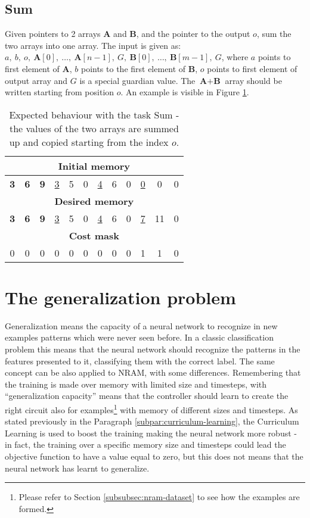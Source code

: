 \subsection{Sum}
Given pointers to 2 arrays \textbf{A} and \textbf{B}, and the pointer to the output $o$, sum the two arrays into one array. The input is given as: $a,\ b,\ o,\ \textbf{A}[0],\ \dots,\ \textbf{A}[n-1],\ G,\ \textbf{B}[0],\ \dots,\ \textbf{B}[m-1],\ G$, where $a$ points to first element of \textbf{A}, $b$ points to the first element of \textbf{B}, $o$ points to first element of output array and $G$ is a special guardian value. The $\textbf{A}+\textbf{B}$ array should be written starting from position $o$. An example is visible in Figure \ref{fig:sum-example}.
\begin{table}[h!]
	\centering
	\begin{tabular}{|c|c|c|c|c|c|c|c|c|c|c|c|}
		\hline
		\multicolumn{12}{|c|}{\textbf{Initial memory}} \\ \hline
		\textbf{3} & \textbf{6} & \textbf{9} & \underline{3} & 5 & 0 & \underline{4} & 6 & 0 & \underline{0} & 0 & 0 \\ \hline\hline\hline
		\multicolumn{12}{|c|}{\textbf{Desired memory}} \\ \hline
		\textbf{3} & \textbf{6} & \textbf{9} & \underline{3} & 5 & 0 & \underline{4} & 6 & 0 & \underline{7} & 11 & 0 \\ \hline\hline\hline
		\multicolumn{12}{|c|}{\textbf{Cost mask}} \\ \hline
		0 & 0 & 0 & 0 & 0 & 0 & 0 & 0 & 0 & 1 & 1 & 0 \\ \hline
	\end{tabular}
	\caption{Expected behaviour with the task Sum - the values of the two arrays are summed up and copied starting from the index $o$.}
	\label{fig:sum-example}
\end{table}
\FloatBarrier
\fi
\section{The generalization problem}
Generalization means the capacity of a neural network to recognize in new examples patterns which were never seen before. In a classic classification problem this means that the neural network should recognize the patterns in the features presented to it, classifying them with the correct label. The same concept can be also applied to NRAM, with some differences. Remembering that the training is made over memory with limited size and timesteps, with ``generalization capacity'' means that the controller should learn to create the right circuit also for examples\footnote{Please refer to Section \ref{subsubsec:nram-dataset} to see how the examples are formed.} with memory of different sizes and timesteps. As stated previously in the Paragraph \ref{subpar:curriculum-learning}, the Curriculum Learning is used to boost the training making the neural network more robust - in fact, the training over a specific memory size and timesteps could lead the objective function to have a value equal to zero, but this does not means that the neural network has learnt to generalize.

